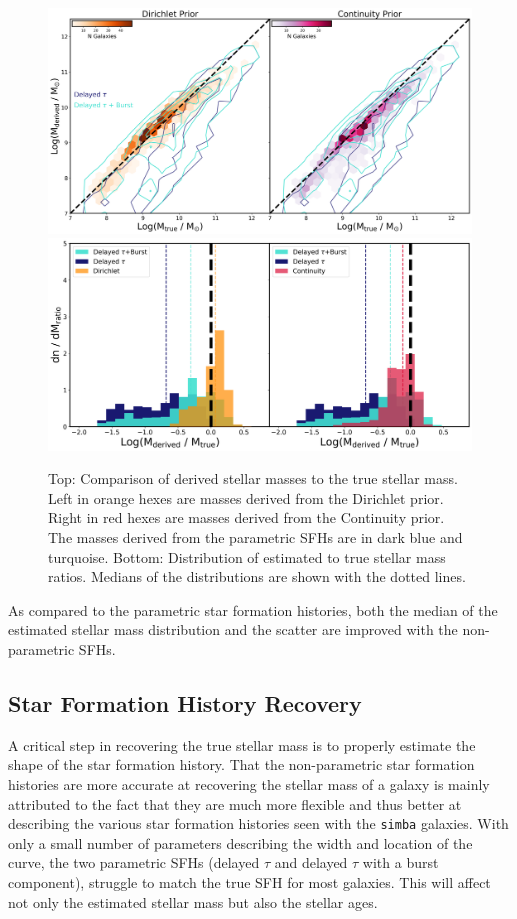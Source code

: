 \documentclass[twocolumn]{aastex62}
\begin{document}
\begin{figure}[h]
    \centering
    \includegraphics[width=\textwidth]{mass_comp.png}\hfill
    \includegraphics[width=\textwidth]{ratio_hist_ultra.png}\hfill
    
    \caption{Top: Comparison of derived stellar masses to the true stellar mass. Left in orange hexes are masses derived from the Dirichlet prior. Right in red hexes are masses derived from the Continuity prior. The masses derived from the parametric SFHs are in dark blue and turquoise. Bottom: Distribution of estimated to true stellar mass ratios. Medians of the distributions are shown with the dotted lines.}
    \label{fig:mass_comp}
\end{figure}

As compared to the parametric star formation histories, both the median of the estimated stellar mass distribution and the scatter are improved with the non-parametric SFHs. 

\subsection{Star Formation History Recovery}

A critical step in recovering the true stellar mass is to properly estimate the shape of the star formation history. That the non-parametric star formation histories are more accurate at recovering the stellar mass of a galaxy is mainly attributed to the fact that they are much more flexible and thus better at describing the various star formation histories seen with the \texttt{simba} galaxies. With only a small number of parameters describing the width and location of the curve, the two parametric SFHs (delayed $\tau$ and delayed $\tau$ with a burst component), struggle to match the true SFH for most galaxies. This will affect not only the estimated stellar mass but also the stellar ages. 
\end{document}

